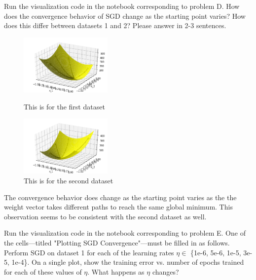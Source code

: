 \begin{problem}[2]
  Run the visualization code in the notebook corresponding to problem D. How does the convergence behavior of SGD change as the starting point varies? How does this differ between datasets 1 and 2? Please answer in 2-3 sentences.
\end{problem}
\begin{solution}
  \begin{figure}[H]
    \centering
    \includegraphics[width=0.4\textwidth]{images/3_static_1.png}
    \caption{This is for the first dataset}
    \label{fig:figure1}
    \centering
    \includegraphics[width=0.4\textwidth]{images/3_static_2.png}
    \caption{This is for the second dataset}
    \label{fig:figure2}
  \end{figure}
  The convergence behavior does change as the starting point varies as the the weight vector takes different paths to reach the same global minimum. This observation seems to be consistent with the second dataset as well.
\end{solution}

\begin{problem}[6]
  Run the visualization code in the notebook corresponding to problem E. One of the cells---titled "Plotting SGD Convergence"---must be filled in as follows. Perform SGD on dataset 1 for each of the learning rates $\eta \in$ \{1e-6, 5e-6, 1e-5, 3e-5, 1e-4\}. On a single plot, show the training error vs. number of epochs trained for each of these values of $\eta$. What happens as $\eta$ changes?
\end{problem}

